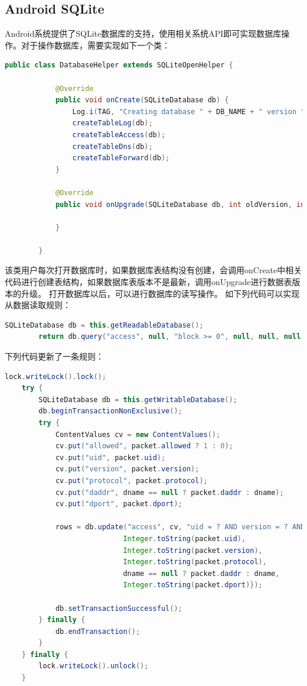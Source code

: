 \documentclass[format=final, language=chinese, degree=fyp]{hustthesis}
\begin{document}
\subsection{Android SQLite}

   Android系统提供了SQLite数据库的支持，使用相关系统API即可实现数据库操作。对于操作数据库，需要实现如下一个类：

\begin{lstlisting}[language=java]
        public class DatabaseHelper extends SQLiteOpenHelper {

            @Override
            public void onCreate(SQLiteDatabase db) {
                Log.i(TAG, "Creating database " + DB_NAME + " version " + DB_VERSION);
                createTableLog(db);
                createTableAccess(db);
                createTableDns(db);
                createTableForward(db);
            }

            @Override
            public void onUpgrade(SQLiteDatabase db, int oldVersion, int newVersion) {

            }

        }
\end{lstlisting}

   该类用户每次打开数据库时，如果数据库表结构没有创建，会调用onCreate中相关代码进行创建表结构，如果数据库表版本不是最新，调用onUpgrade进行数据表版本的升级。
   打开数据库以后，可以进行数据库的读写操作。
   如下列代码可以实现从数据读取规则：

	\begin{lstlisting}[language=java]
        SQLiteDatabase db = this.getReadableDatabase();
        return db.query("access", null, "block >= 0", null, null, null, "uid");
	\end{lstlisting}

   下列代码更新了一条规则：

\begin{lstlisting}[language=java]
    lock.writeLock().lock();
    try {
        SQLiteDatabase db = this.getWritableDatabase();
        db.beginTransactionNonExclusive();
        try {
            ContentValues cv = new ContentValues();
            cv.put("allowed", packet.allowed ? 1 : 0);
            cv.put("uid", packet.uid);
            cv.put("version", packet.version);
            cv.put("protocol", packet.protocol);
            cv.put("daddr", dname == null ? packet.daddr : dname);
            cv.put("dport", packet.dport);

            rows = db.update("access", cv, "uid = ? AND version = ? AND protocol = ? AND daddr = ? AND dport = ?", new String[]{
                            Integer.toString(packet.uid),
                            Integer.toString(packet.version),
                            Integer.toString(packet.protocol),
                            dname == null ? packet.daddr : dname,
                            Integer.toString(packet.dport)});

            db.setTransactionSuccessful();
        } finally {
            db.endTransaction();
        }
    } finally {
        lock.writeLock().unlock();
    }
\end{lstlisting}
\end{document}
